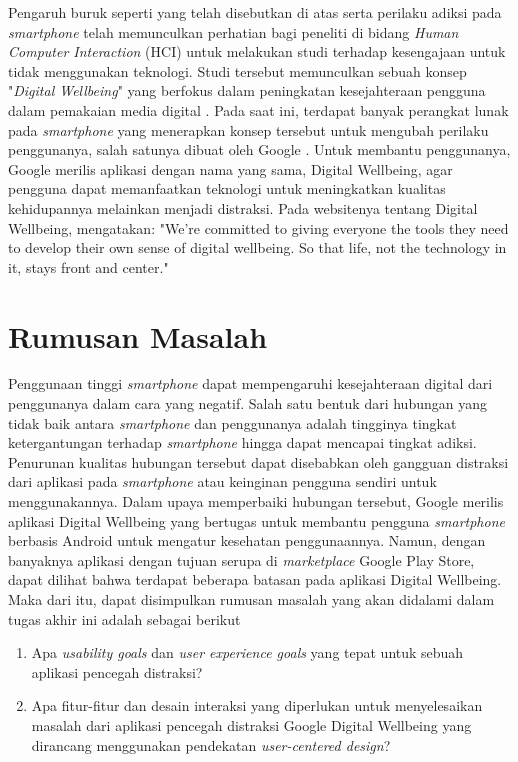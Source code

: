 Pengaruh buruk seperti yang telah disebutkan di atas serta perilaku adiksi pada \textit{smartphone} telah memunculkan perhatian bagi peneliti di bidang \textit{Human Computer Interaction} (HCI) untuk melakukan studi terhadap kesengajaan untuk tidak menggunakan teknologi. Studi tersebut memunculkan sebuah konsep "\textit{Digital Wellbeing}" yang berfokus dalam peningkatan kesejahteraan pengguna dalam pemakaian media digital \parencite{unesco2015dwconference}. Pada saat ini, terdapat banyak perangkat lunak pada \textit{smartphone} yang menerapkan konsep tersebut untuk mengubah perilaku penggunanya, salah satunya dibuat oleh Google \parencite{CHI2019SOCIALIZE}. Untuk membantu penggunanya, Google merilis aplikasi dengan nama yang sama, Digital Wellbeing, agar pengguna dapat memanfaatkan teknologi untuk meningkatkan kualitas kehidupannya melainkan menjadi distraksi. Pada websitenya tentang Digital Wellbeing, \textcite{google2019digitalwellbeing} mengatakan: "We’re committed to giving everyone the tools they need to develop their own sense of digital wellbeing. So that life, not the technology in it, stays front and center." 


\section{Rumusan Masalah}

Penggunaan tinggi \textit{smartphone} dapat mempengaruhi kesejahteraan digital dari penggunanya dalam cara yang negatif. Salah satu bentuk dari hubungan yang tidak baik antara \textit{smartphone} dan penggunanya adalah tingginya tingkat ketergantungan terhadap \textit{smartphone} hingga dapat mencapai tingkat adiksi. Penurunan kualitas hubungan tersebut dapat disebabkan oleh gangguan distraksi dari aplikasi pada \textit{smartphone} atau keinginan pengguna sendiri untuk menggunakannya. Dalam upaya memperbaiki hubungan tersebut, Google merilis aplikasi Digital Wellbeing yang bertugas untuk membantu pengguna \textit{smartphone} berbasis Android untuk mengatur kesehatan penggunaannya. Namun, dengan banyaknya aplikasi dengan tujuan serupa di \textit{marketplace} Google Play Store, dapat dilihat bahwa terdapat beberapa batasan pada aplikasi Digital Wellbeing. Maka dari itu, dapat disimpulkan rumusan masalah yang akan didalami dalam tugas akhir ini adalah sebagai berikut

\begin{enumerate}
  \item Apa \textit{usability goals} dan \textit{user experience goals} yang tepat untuk sebuah aplikasi pencegah distraksi?
  \item Apa fitur-fitur dan desain interaksi yang diperlukan untuk menyelesaikan masalah dari aplikasi pencegah distraksi Google Digital Wellbeing yang dirancang menggunakan pendekatan \textit{user-centered design}?
\end{enumerate}


